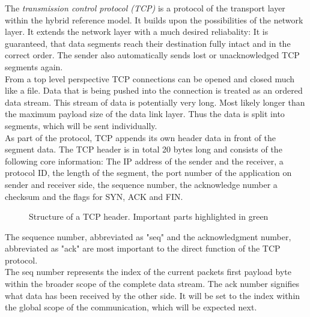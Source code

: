 The \textit{transmission control protocol (TCP)} is a protocol of the transport layer within the hybrid reference model. It builds upon the possibilities of the network layer. It extends the network layer with a much desired reliabality: It is guaranteed, that data segments reach their destination fully intact and in the correct order. The sender also automatically sends lost or unacknowledged TCP segments again.\\
From a top level perspective TCP connections can be opened and closed much like a file. Data that is being pushed into the connection is treated as an ordered data stream. This stream of data is potentially very long. Most likely longer than the maximum payload size of the data link layer. Thus the data is split into segments, which will be sent individually.\\
As part of the protocol, TCP appends its own header data in front of the segment data. The TCP header is in total 20 bytes long and consists of the following core information: The IP address of the sender and the receiver, a protocol ID, the length of the segment, the port number of the application on sender and receiver side, the sequence number, the acknowledge number a checksum and the flags for SYN, ACK and FIN.
\cite{ComputerNetworks}

\setlength{\fboxsep}{2pt}%
\setlength{\fboxrule}{0pt}%
\begin{figure}[h]
\centering
{}
\caption[Structure of a TCP header]{Structure of a TCP header. Important parts highlighted in green}
\end{figure}

The sequence number, abbreviated as "seq" and the acknowledgment number, abbreviated as "ack" are most important to the direct function of the TCP protocol.\\
The seq number represents the index of the current packets first payload byte within the broader scope of the complete data stream. The ack number signifies what data has been received by the other side. It will be set to the index within the global scope of the communication, which will be expected next.\par 

